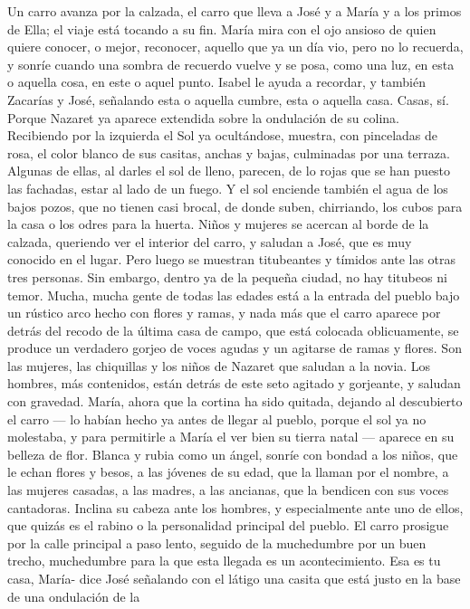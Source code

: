 \documentclass[12pt]{book} %
\begin{document}
Un carro avanza por la calzada, el carro que lleva a José y a María y a los primos de Ella; el viaje está tocando a su fin. 
María mira con el ojo ansioso de quien quiere conocer, o mejor, reconocer, aquello que ya un día vio, pero no lo recuerda, y sonríe cuando una sombra de recuerdo vuelve y se posa, como una luz, en esta o aquella cosa, en este o aquel punto. Isabel le ayuda a recordar, y también Zacarías y José, señalando esta o aquella cumbre, esta o aquella casa. 
Casas, sí. Porque Nazaret ya aparece extendida sobre la ondulación de su colina. Recibiendo por la izquierda el Sol ya 
ocultándose, muestra, con pinceladas de rosa, el color blanco de sus casitas, anchas y bajas, culminadas por una terraza. Algunas de ellas, al darles el sol de lleno, parecen, de lo rojas que se han puesto las fachadas, estar al lado de un fuego. Y el sol enciende también el agua de los bajos pozos, que no tienen casi brocal, de donde suben, chirriando, los cubos para la casa o los odres para la huerta. 
Niños y mujeres se acercan al borde de la calzada, queriendo ver el interior del carro, y saludan a José, que es muy 
conocido en el lugar. Pero luego se muestran titubeantes y tímidos ante las otras tres personas. 
Sin embargo, dentro ya de la pequeña ciudad, no hay titubeos ni temor. Mucha, mucha gente de todas las edades está 
a la entrada del pueblo bajo un rústico arco hecho con flores y ramas, y nada más que el carro aparece por detrás del recodo de la última casa de campo, que está colocada oblicuamente, se produce un verdadero gorjeo de voces agudas y un agitarse de ramas y flores. Son las mujeres, las chiquillas y los niños de Nazaret que saludan a la novia. Los hombres, más contenidos, están detrás de este seto agitado y gorjeante, y saludan con gravedad. 
María, ahora que la cortina ha sido quitada, dejando al descubierto el carro — lo habían hecho ya antes de llegar al 
pueblo, porque el sol ya no molestaba, y para permitirle a María el ver bien su tierra natal — aparece en su belleza de flor. Blanca y rubia como un ángel, sonríe con bondad a los niños, que le echan flores y besos, a las jóvenes de su edad, que la llaman por el nombre, a las mujeres casadas, a las madres, a las ancianas, que la bendicen con sus voces cantadoras. Inclina su cabeza ante los hombres, y especialmente ante uno de ellos, que quizás es el rabino o la personalidad principal del pueblo. 
El carro prosigue por la calle principal a paso lento, seguido de la muchedumbre por un buen trecho, muchedumbre 
para la que esta llegada es un acontecimiento. 
Esa es tu casa, María- dice José señalando con el látigo una casita que está justo en la base de una ondulación de la 
\end{document}
